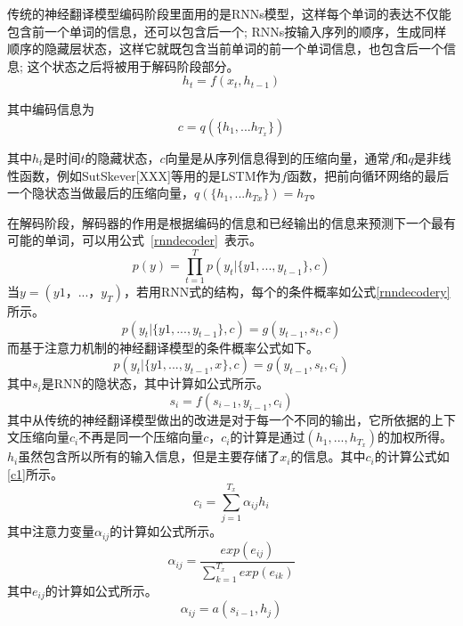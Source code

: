 传统的神经翻译模型编码阶段里面用的是RNNs模型，这样每个单词的表达不仅能包含前一个单词的信息，还可以包含后一个; RNNs按输入序列的顺序，生成同样顺序的隐藏层状态，这样它就既包含当前单词的前一个单词信息，也包含后一个信息; 这个状态之后将被用于解码阶段部分。
\begin{equation}\label{lstm_f} h_t = f(x_t,h_{t-1}) \end{equation}

其中编码信息为
\begin{equation}\label{lstm_f} c = q(\lbrace h_1,...h_{T_x} \rbrace ) \end{equation}

其中$h_t$是时间$t$的隐藏状态，$c$向量是从序列信息得到的压缩向量，通常$f$和$q$是非线性函数，例如SutSkever[XXX]等用的是LSTM作为$f$函数，把前向循环网络的最后一个隐状态当做最后的压缩向量，$q(\lbrace h_1,...h_{Tx} \rbrace )=h_T$。

在解码阶段，解码器的作用是根据编码的信息和已经输出的信息来预测下一个最有可能的单词，可以用公式~\ref{rnndecoder}~表示。
\begin{equation}\label{rnndecoder} p(y) = \prod_{t=1}^{T} p(y_t|\lbrace y1,...,y_{t-1} \rbrace , c) \end{equation}
当$y=(y1，...，y_{T})$，若用RNN式的结构，每个的条件概率如公式\ref{rnndecodery}所示。
\begin{equation}\label{rnndecodery} p(y_t|\lbrace y1,...,y_{t-1} \rbrace , c) = g(y_{t-1},s_t, c)\end{equation}
而基于注意力机制的神经翻译模型的条件概率公式如下。
\begin{equation}\label{} p(y_t|\lbrace y1,...,y_{t-1},x \rbrace,c) = g(y_{t-1},s_t,c_i)\end{equation}
其中$s_i$是RNN的隐状态，其中计算如公式所示。
\begin{equation}\label{} s_i = f(s_{i-1},y_{i-1}, c_i)\end{equation}
其中从传统的神经翻译模型做出的改进是对于每一个不同的输出，它所依据的上下文压缩向量$c_i$不再是同一个压缩向量$c$，$c_i$的计算是通过$(h_1,...,h_{T_x})$的加权所得。$h_i$虽然包含所以所有的输入信息，但是主要存储了$x_i$的信息。其中$c_i$的计算公式如\ref{c1}所示。
\begin{equation}\label{c1} c_i = \sum_{j=1}^{T_x} \alpha_{ij}h_i\end{equation}
其中注意力变量$\alpha_{ij}$的计算如公式所示。
\begin{equation}\label{alpha} \alpha_{ij} = \frac{exp(e_{ij})}{\sum_{k=1}^{T_x}exp(e_{ik})}\end{equation}
其中$e_{ij}$的计算如公式所示。
\begin{equation}\label{eij} \alpha_{ij} = a(s_{i-1},h_j)\end{equation}

